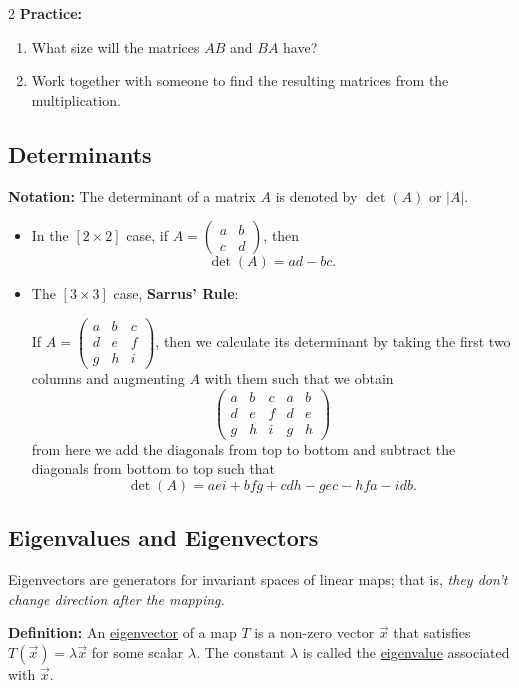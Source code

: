 \documentclass[12pt]{article}
\begin{document}
\begin{multicols}{2}
\textbf{Practice:}
  \begin{enumerate}
    \item What size will the matrices \(AB\) and \(BA\) have?
    \item Work together with someone to find the resulting matrices from the multiplication.
  \end{enumerate}

\subsection*{Determinants}

\textbf{Notation:}
The determinant of a matrix \(A\) is denoted by \(\det(A)\) or \(|A|\).


\begin{itemize}
  \item In the \([2\times 2]\) case, if \(A=\begin{pmatrix}
    a&b\\c&d
  \end{pmatrix}\), then
  \[\det(A)=ad-bc.\]
  
  \item The \([3\times 3]\) case, \textbf{Sarrus' Rule}:\par 
  If \(A=\begin{pmatrix}
    a&b&c\\d&e&f\\g&h&i
  \end{pmatrix}\), then we calculate its determinant by taking the first two columns and augmenting \(A\) with them such that we obtain
  \[\left(\begin{array}{ccc|cc}
    a&b&c&a&b\\d&e&f&d&e\\g&h&i&g&h
  \end{array}\right)\]
  from here we add the diagonals from top to bottom and subtract the diagonals from bottom to top such that 
  \[\det(A)=aei+bfg+cdh-gec-hfa-idb.\]
\end{itemize}

\subsection*{Eigenvalues and Eigenvectors}

Eigenvectors are generators for invariant spaces of linear maps; that is, \emph{they don't change direction after the mapping.}

\textbf{Definition:} An \underline{eigenvector} of a map \(T\) is a non-zero vector \(\vec{x}\) that satisfies \(T(\vec{x})=\lambda\vec{x}\) for some scalar \(\lambda\). The constant \(\lambda\) is called the \underline{eigenvalue} associated with \(\vec{x}\).\par


\end{multicols}
\end{document}
